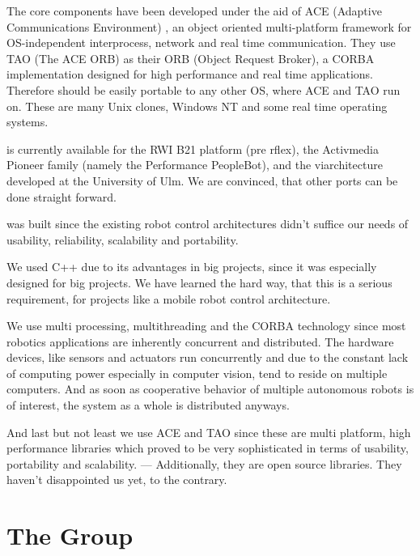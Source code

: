 \documentclass[10pt]{book}
\begin{document}
The \miro core components have been developed under the aid of ACE
(Adaptive Communications Environment) \cite{ACE-Paper, ACE-Manual}, an
object oriented multi-platform framework for OS-independent
interprocess, network and real time communication. They use TAO (The
ACE ORB) \cite{TAO-paper} as their ORB (Object Request Broker), a
CORBA implementation designed for high performance and real time
applications. Therefore \miro should be easily portable to any other
OS, where ACE and TAO run on.  These are many Unix clones, Windows NT
and some real time operating systems.

\miro is currently available for the RWI B21 platform (pre rflex), the
Activmedia Pioneer family (namely the Performance PeopleBot), and the
vi\sparrow architecture developed at the University of Ulm.  We are
convinced, that other ports can be done straight forward.

\miro was built since the existing robot control architectures didn't
suffice our needs of usability, reliability, scalability and
portability.

We used C++ due to its advantages in big projects, since it was
especially designed for big projects. We have learned the hard way,
that this is a serious requirement, for projects like a mobile robot
control architecture.

We use multi processing, multithreading and the CORBA technology since
most robotics applications are inherently concurrent and distributed.
The hardware devices, like sensors and actuators run concurrently and
due to the constant lack of computing power especially in computer
vision, tend to reside on multiple computers. And as soon as
cooperative behavior of multiple autonomous robots is of interest, the
system as a whole is distributed anyways.


And last but not least we use ACE and TAO since these are multi
platform, high performance libraries which proved to be very
sophisticated in terms of usability, portability and scalability. ---
Additionally, they are open source libraries. They haven't
disappointed us yet, to the contrary.

\section{The \miro Group}
\end{document}
